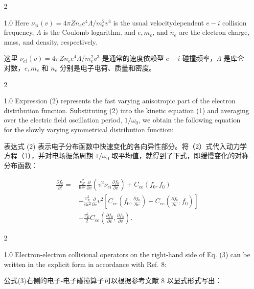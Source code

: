 \documentclass[oneside,onecolumn]{article}
\newcommand\enzhbox[2]{
  	\quad\par \begin{paracol}{2} \colseprulecolor{black} 
  			\begin{spacing}{1.0}
  				\footnotesize  #1
  			\end{spacing}
  		\switchcolumn[1] 
  		#2
  	\end{paracol} 
  }
\begin{document}
\begin{sloppypar}
 
\enzhbox{   Here $\nu_{e i}(v)=4 \pi Z n_{e} e^{4} \Lambda / m_{e}^{2} v^{3}$ is the usual velocitydependent $e-i$ collision frequency, $\Lambda$ is the Coulomb logarithm, and $e, m_{e}$, and $n_{e}$ are the electron charge, mass, and density, respectively.
}{
这里 $\nu_{e i}(v)=4 \pi Z n_{e} e^{4} \Lambda / m_{e}^{2} v^{3}$ 是通常的速度依赖型 $e-i$ 碰撞频率，$\Lambda$ 是库仑对数，$e, m_{e}$ 和 $n_{e}$ 分别是电子电荷、质量和密度。

}
  
 
\enzhbox{   Expression (2) represents the fast varying anisotropic part of the electron distribution function. Substituting (2) into the kinetic equation (1) and averaging over the electric field oscillation period, $1 / \omega_{0}$, we obtain the following equation for the slowly varying symmetrical distribution function:
}{
表达式 (2) 表示电子分布函数中快速变化的各向异性部分。将（2）式代入动力学方程（1），并对电场振荡周期 $1 / \omega_{0}$ 取平均值，就得到了下式，即缓慢变化的对称分布函数：

}
  
  \begin{dmath}[compact]
  \begin{aligned}
  \frac{\partial f_{0}}{\partial t}= & \frac{v_{E}^{2}}{6 v^{2}} \frac{\partial}{\partial v}\left(v^{2} \nu_{e i} \frac{\partial f_{0}}{\partial v}\right)+C_{e e}\left(f_{0}, f_{0}\right) \\
  & -\frac{v_{E}^{2}}{6 v^{2}} \frac{\partial}{\partial v} v^{2}\left[C_{e e}\left(f_{0}, \frac{\partial f_{0}}{\partial v}\right)+C_{e e}\left(\frac{\partial f_{0}}{\partial v}, f_{0}\right)\right] \\
  & -\frac{v_{E}^{2}}{2} C_{e e}\left(\frac{\partial f_{0}}{\partial v}, \frac{\partial f_{0}}{\partial v}\right) .
  \end{aligned}
  \end{dmath}
  
 
\enzhbox{   Electron-electron collisional operators on the right-hand side of Eq. (3) can be written in the explicit form in accordance with Ref. 8:
}{
公式(3)右侧的电子-电子碰撞算子可以根据参考文献 8 以显式形式写出：

}
  

\end{sloppypar}
\end{document}
